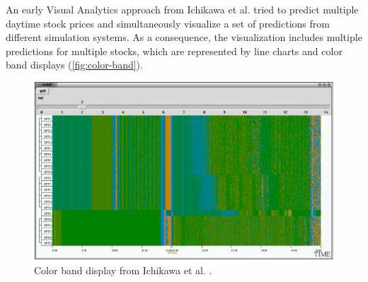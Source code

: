 \documentclass[electronic]{vgtc}             %
\begin{document}
An early Visual Analytics approach from Ichikawa et al. \cite{ichikawa:2002} tried to predict multiple daytime stock prices and simultaneously visualize a set of predictions from different simulation systems. 
As a consequence, the visualization includes multiple predictions for multiple stocks, which are represented by line charts and color band displays (\autoref{fig:color-band}).

\begin{figure}[!b]
	\centering
	\includegraphics[width=\columnwidth]{color-band}
	\caption{Color band display from Ichikawa et al. \cite{ichikawa:2002}.}
	\label{fig:color-band}
\end{figure}
\end{document}
